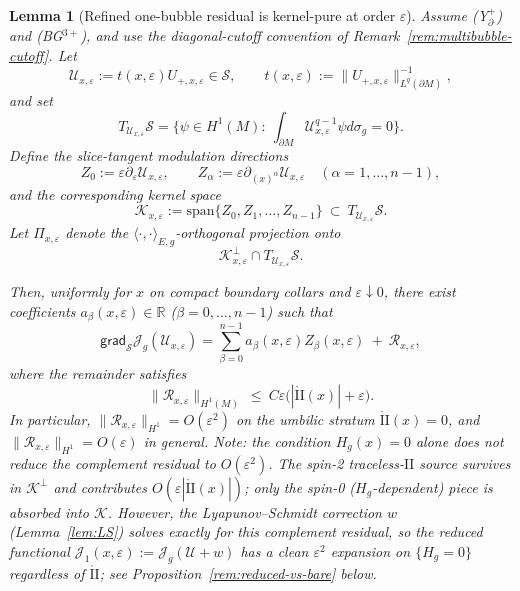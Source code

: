 \documentclass[11pt,reqno,a4paper]{amsart}
\numberwithin{equation}{section}
\theoremstyle{plain}
\newtheorem{lemma}[theorem]{Lemma}
\theoremstyle{remark}
\theoremstyle{plain}
\begin{document}
\begin{lemma}[Refined one-bubble residual is kernel-pure at order $\varepsilon$]\label{lem:residual-kernel-pure}
Assume \textup{(Y$^+_{\partial}$)} and \textup{(BG$^{3+}$)}, and use the diagonal-cutoff convention of
Remark~\ref{rem:multibubble-cutoff}. Let
\[
\mathcal U_{x,\varepsilon}:=t(x,\varepsilon)U_{+,x,\varepsilon}\in\mathcal S,
\qquad
t(x,\varepsilon):=\|U_{+,x,\varepsilon}\|_{L^q(\partial M)}^{-1},
\]
and set
\[
T_{\mathcal U_{x,\varepsilon}}\mathcal S
=\Big\{\psi\in H^1(M):\ \int_{\partial M}\mathcal U_{x,\varepsilon}^{q-1}\psi d\sigma_g=0\Big\}.
\]
Define the slice-tangent modulation directions
\[
Z_0:=\varepsilon\partial_\varepsilon\mathcal U_{x,\varepsilon},\qquad
Z_\alpha:=\varepsilon\partial_{(x)^\alpha}\mathcal U_{x,\varepsilon}\quad(\alpha=1,\dots,n-1),
\]
and the corresponding kernel space
\[
\mathcal K_{x,\varepsilon}:=\mathrm{span}\{Z_0,Z_1,\dots,Z_{n-1}\}\ \subset\ T_{\mathcal U_{x,\varepsilon}}\mathcal S.
\]
Let $\Pi_{x,\varepsilon}$ denote the $\langle\cdot,\cdot\rangle_{E,g}$-orthogonal projection onto
\[
\mathcal K_{x,\varepsilon}^\perp\cap T_{\mathcal U_{x,\varepsilon}}\mathcal S.
\]

Then, uniformly for $x$ on compact boundary collars and $\varepsilon\downarrow0$, there exist coefficients
$a_\beta(x,\varepsilon)\in\mathbb R$ ($\beta=0,\dots,n-1$) such that
\begin{equation}\label{eq:residual-kernel-decomp}
\mathsf{grad}_{\mathcal S}\mathcal J_g(\mathcal U_{x,\varepsilon})
=
\sum_{\beta=0}^{n-1} a_\beta(x,\varepsilon)Z_\beta(x,\varepsilon)
\ +\ \mathcal R_{x,\varepsilon},
\end{equation}
where the remainder satisfies
\begin{equation}\label{eq:residual-perp-bound}
\|\mathcal R_{x,\varepsilon}\|_{H^1(M)}\ \le\ C\varepsilon\big(|\mathring{\mathrm{II}}(x)|+\varepsilon\big).
\end{equation}
In particular, $\|\mathcal R_{x,\varepsilon}\|_{H^1}=O(\varepsilon^2)$ on the umbilic stratum $\mathring{\mathrm{II}}(x)=0$,
and $\|\mathcal R_{x,\varepsilon}\|_{H^1}=O(\varepsilon)$ in general.
\emph{Note:} the condition $H_g(x)=0$ alone does \emph{not} reduce the complement residual to $O(\varepsilon^2)$.
The spin-2 traceless-$\mathrm{II}$ source survives in $\mathcal K^\perp$ and contributes
$O(\varepsilon|\mathring{\mathrm{II}}(x)|)$; only the spin-0 ($H_g$-dependent) piece is absorbed into
$\mathcal K$. However, the Lyapunov--Schmidt correction $w$ (Lemma~\ref{lem:LS}) solves exactly
for this complement residual, so the \emph{reduced functional}
$\mathcal J_1(x,\varepsilon):=\mathcal J_g(\mathcal U+w)$ has a clean $\varepsilon^2$ expansion
on $\{H_g=0\}$ regardless of $\mathring{\mathrm{II}}$; see Proposition~\ref{rem:reduced-vs-bare} below.
\end{lemma}
\end{document}
